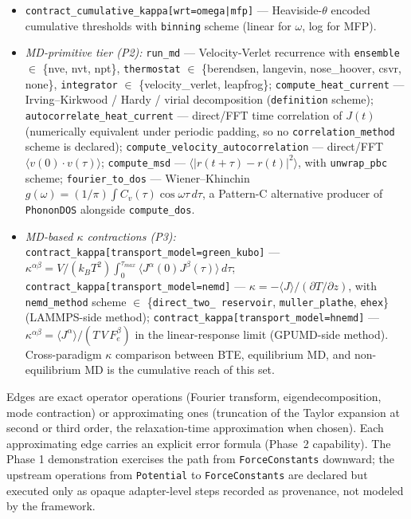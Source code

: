 \documentclass[11pt,a4paper]{article}
\begin{document}
\begin{itemize}[leftmargin=2em, itemsep=0.2em]
  \item \texttt{contract\_cumulative\_kappa[wrt=omega|mfp]} ---
        Heaviside-$\theta$ encoded cumulative thresholds with
        \texttt{binning} scheme (linear for $\omega$, log for MFP).
  \item \emph{MD-primitive tier (P2):}
        \texttt{run\_md} --- Velocity-Verlet recurrence with
        \texttt{ensemble} $\in$ \{nve, nvt, npt\},
        \texttt{thermostat} $\in$ \{berendsen, langevin, nose\_hoover,
        csvr, none\}, \texttt{integrator} $\in$ \{velocity\_verlet,
        leapfrog\};
        \texttt{compute\_heat\_current} --- Irving--Kirkwood / Hardy
        / virial decomposition (\texttt{definition} scheme);
        \texttt{autocorrelate\_heat\_current} --- direct/FFT time
        correlation of $J(t)$ (numerically equivalent under periodic
        padding, so no \texttt{correlation\_method} scheme is declared);
        \texttt{compute\_velocity\_autocorrelation} --- direct/FFT
        $\langle v(0)\cdot v(\tau)\rangle$;
        \texttt{compute\_msd} --- $\langle |r(t+\tau)-r(t)|^2\rangle$,
        with \texttt{unwrap\_pbc} scheme;
        \texttt{fourier\_to\_dos} --- Wiener--Khinchin $g(\omega) =
        (1/\pi)\int C_v(\tau)\cos\omega\tau\,d\tau$, a Pattern-C
        alternative producer of \texttt{PhononDOS} alongside
        \texttt{compute\_dos}.
  \item \emph{MD-based $\kappa$ contractions (P3):}
        \texttt{contract\_kappa[transport\_model=green\_kubo]} ---
        $\kappa^{\alpha\beta} = V/(k_B T^2) \int_0^{\tau_{max}}
        \langle J^\alpha(0)J^\beta(\tau)\rangle\,d\tau$;
        \texttt{contract\_kappa[transport\_model=nemd]} ---
        $\kappa = -\langle J\rangle / (\partial T/\partial z)$, with
        \texttt{nemd\_method} scheme $\in$ \{\texttt{direct\_two\_
        reservoir}, \texttt{muller\_plathe}, \texttt{ehex}\} (LAMMPS-side
        method);
        \texttt{contract\_kappa[transport\_model=hnemd]} ---
        $\kappa^{\alpha\beta} = \langle J^\alpha\rangle / (T\,V\,F_e^\beta)$
        in the linear-response limit (GPUMD-side method). Cross-paradigm
        $\kappa$ comparison between BTE, equilibrium MD, and
        non-equilibrium MD is the cumulative reach of this set.
\end{itemize}

Edges are exact operator operations (Fourier transform, eigendecomposition, mode
contraction) or approximating ones (truncation of the Taylor expansion at second or
third order, the relaxation-time approximation when chosen). Each approximating edge
carries an explicit error formula (Phase~2 capability). The Phase 1 demonstration
exercises the path from \texttt{ForceConstants} downward; the upstream operations from
\texttt{Potential} to \texttt{ForceConstants} are declared but executed only as opaque
adapter-level steps recorded as provenance, not modeled by the framework.
\end{document}
